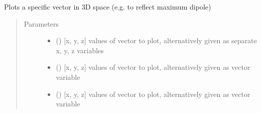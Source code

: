 \documentclass[letterpaper,10pt,english]{sphinxmanual}
\begin{document}
\begin{fulllineitems}
\label{\detokenize{_autosummary/signalplot.vcg.plot_xyz_vector:signalplot.vcg.plot_xyz_vector}}
\sphinxAtStartPar
Plots a specific vector in 3D space (e.g. to reflect maximum dipole)
\begin{quote}\begin{description}
\item[{Parameters}] \leavevmode\begin{itemize}
\item {} 
\sphinxAtStartPar
{} () \textendash{} {[}x, y, z{]} values of vector to plot, alternatively given as separate x, y, z variables

\item {} 
\sphinxAtStartPar
{} () \textendash{} {[}x, y, z{]} values of vector to plot, alternatively given as vector variable

\item {} 
\sphinxAtStartPar
{} () \textendash{} {[}x, y, z{]} values of vector to plot, alternatively given as vector variable


\end{itemize}
\end{description}
\end{quote}
\end{fulllineitems}
\end{document}
